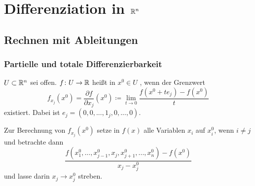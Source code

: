 \chapter{Differenziation in $ \mathbb{R}^n $}
\section{Rechnen mit Ableitungen}
\subsection{Partielle und totale Differenzierbarkeit}
\changesubsection
\begin{definition}
	$ U\subset\mathbb{R}^n $ sei offen. $ f\colon U\rightarrow \mathbb{R} $ hei\ss t in $ x^0\in U $ , wenn der Grenzwert \[ f_{x_j}(x^0)=\frac{\partial f}{\partial x_j}(x^0)\coloneqq\lim_{t\to 0}\frac{f(x^0+te_j)-f(x^0)}{t} \]
	existiert. Dabei ist $ e_j=(0,0,...,1_j,0,...,0) $.
\end{definition}
Zur Berechnung von $ f_{x_j}(x^0) $ setze in $ f(x) $ alle Variablen $ x_i $ auf $ x_i^0 $, wenn $ i\neq j $ und betrachte dann	\[ \frac{f(x_1^0,...,x_{j-1}^0, x_j,x_{j+1}^0,...,x_n^0)-f(x^0)}{x_j-x_j^0} \]
und lasse darin $ x_j\to x_j^0 $ streben.
